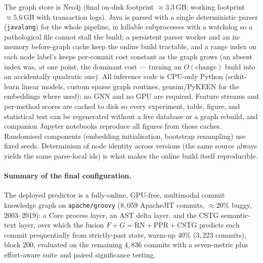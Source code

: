 	The graph store is Neo4j (final on-disk footprint $\approx\!3.3$\,GB; working footprint
	$\approx\!5.6$\,GB with transaction logs). Java is parsed with a single deterministic
	parser (\texttt{javalang}) for the whole pipeline, in killable subprocesses with a
	watchdog so a pathological file cannot stall the build; a persistent parser worker and
	an in-memory before-graph cache keep the online build tractable, and a range index on
	each node label's  keeps per-commit cost constant as the graph grows (an
	absent index was, at one point, the dominant cost --- turning an $O(\text{change})$
	build into an accidentally quadratic one). All inference code is CPU-only Python
	(scikit-learn linear models, custom sparse graph routines, gensim/PyKEEN for the
	embeddings where used); no GNN and no GPU are required. Feature streams and per-method
	scores are cached to disk so every experiment, table, figure, and statistical test can
	be regenerated without a live database or a graph rebuild, and companion Jupyter
	notebooks reproduce all figures from those caches. Randomised components (embedding
	initialisation, bootstrap resampling) use fixed seeds. Determinism of node identity
	across versions (the same source always yields the same parse-local ids) is what makes
	the online build itself reproducible.
	
	\paragraph{Summary of the final configuration.} The deployed predictor is a
	fully-online, GPU-free, multimodal commit knowledge graph on \texttt{apache/groovy}
	($8{,}059$ ApacheJIT commits, $\approx\!20\%$ buggy, 2003--2019): a Core process layer,
	an AST delta layer, and the CSTG semantic-text layer, over which the fusion
	$F{+}G=\text{RN}{+}\text{PPR}{+}\text{CSTG}$ predicts each commit prequentially from
	strictly-past state, warm-up $40\%$ ($3{,}223$ commits), block $200$, evaluated on the
	remaining $4{,}836$ commits with a seven-metric plus effort-aware suite and paired
	significance testing.

